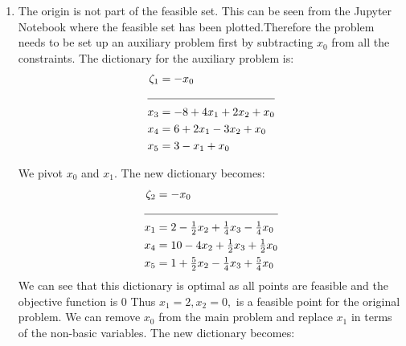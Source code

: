 \documentclass[letterpaper,12pt]{article}
\theoremstyle{definition}
\begin{document}
\begin{enumerate}
  \item The origin is not part of the feasible set. This can be seen from the Jupyter Notebook where the
  feasible set has been plotted.Therefore the problem needs to be set up an auxiliary problem first by subtracting $x_0$ from all the
  constraints. The dictionary for the auxiliary problem is:
  \begin{align*}
    \zeta_1 &= -x_0\\
    \cline{1-2}
    x_3 &= -8 + 4x_1 + 2x_2 + x_0\\
    x_4 &= 6 + 2x_1 -3x_2+ x_0\\
    x_5 &= 3-x_1+x_0
  \end{align*}

  We pivot $x_0$ and $x_1$. The new dictionary becomes:
  \begin{align*}
    \zeta_2 &= -x_0\\
    \cline{1-2}
    x_1 &= 2 - \tfrac{1}{2}x_2 + \tfrac{1}{4}x_3-\tfrac{1}{4}x_0\\
    x_4 &= 10 - 4x_2 +\tfrac{1}{2}x_3+ \tfrac{1}{2}x_0\\
    x_5 &= 1+\tfrac{5}{2}x_2 - \tfrac{1}{4}x_3 + \tfrac{5}{4}x_0\\
  \end{align*}
  We can see that this dictionary is optimal as all points are feasible and the objective function is 0
  Thus $x_1=2, x_2=0, $ is a feasible point for the original problem. We can remove $x_0$ from the main problem
  and replace $x_1$ in terms of the non-basic variables. The new dictionary becomes:


\end{enumerate}
\end{document}
